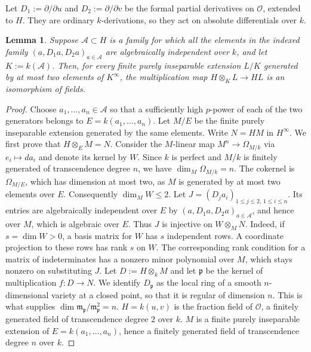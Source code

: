 \documentclass[11pt,a4paper]{amsart}
\numberwithin{equation}{section}
\newtheorem{lemma}[theorem]{Lemma}
\newcommand{\Aset}{\mathcal A}
\newcommand{\perf}{^{\infty}}
\begin{document}
Let $D_1:=\partial/\partial u$ and $D_2:=\partial/\partial v$ be
the formal partial derivatives on $\mathcal{O}$, extended to $H$.
They are ordinary $k$-derivations, so they act on absolute
differentials over $k$.
 	
\begin{lemma}\label{lem:fields}
Suppose $\Aset\subset H$ is a family for which all the elements in
 the indexed family
$(a,D_1a,D_2a)_{a\in\Aset}$
 are algebraically independent over $k$, and let $K:=k(\Aset)$.
Then, for every finite purely inseparable extension $L/K$ generated by
at most two elements of $K\perf$, the multiplication map
$	H\otimes_K L\to HL$
is an isomorphism of fields.
 \end{lemma}
 	
\begin{proof}
Choose $a_1,\ldots,a_n\in\Aset$ so that a sufficiently high
$p$-power of each of the two generators belongs to
$E=k(a_1,\ldots,a_n)$. Let $M/E$ be the finite purely inseparable
 extension generated by the same elements. Write $N=HM$ in $H\perf$.
We first prove that $H\otimes_E M=N$.
Consider the $M$-linear map
$	M^n\rightarrow\Omega_{M/k}$ via $ e_i\mapsto da_i$
and denote its kernel by $W$. Since $k$ is perfect and $M/k$
is finitely generated of transcendence degree $n$, we have
$\dim_M\Omega_{M/k}=n$. The cokernel is $\Omega_{M/E}$, which
has dimension at most two, as $M$ is generated by at most two
elements over $E$. Consequently $\dim_M W\leq 2$.
Let $J=(D_j a_i)_{1\leq j\leq 2,\,1\leq i\leq n}$. Its entries
are algebraically independent over $E$ by $	(a,D_1a,D_2a)_{a\in\Aset}$,
and hence over $M$, which is algebraic over $E$.
Thus $J$ is injective on $W\otimes_M N$. Indeed, if $s=\dim W>0$,	a basis matrix for $W$ has $s$ independent rows. A coordinate
projection to these rows has rank $s$ on $W$. The corresponding
 rank condition for a matrix of indeterminates has a nonzero minor
 polynomial over $M$, which stays nonzero on substituting $J$.
 Let $D:=H\otimes_k M$ and let $\mathfrak p$ be the kernel of
 multiplication $f:D\to N$.
 We identify \(D_{\mathfrak p}\) as the local ring of a smooth
 \(n\)-dimensional variety at a closed point, so that it is regular of
 	dimension \(n\). This is what supplies
\(\dim\mathfrak m_{\mathfrak p}/\mathfrak m_{\mathfrak p}^2=n\).
\(H=k(u,v)\) is the fraction field of \(	\mathcal{O}\), a finitely
generated field of transcendence degree \(2\) over \(k\). \(M\) is a
finite purely inseparable extension of \(E=k(a_1,\dots,a_n)\), hence a
finitely generated field of transcendence degree \(n\) over \(k\).

\end{proof}
\end{document}
